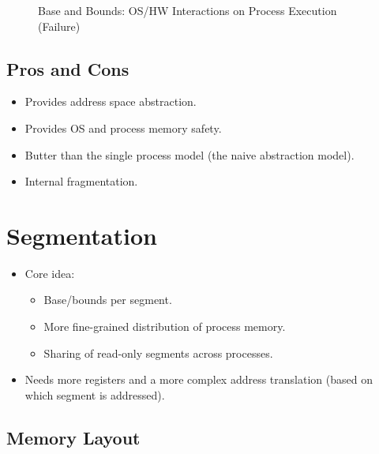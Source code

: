 \documentclass[a4paper, 11pt, accentcolor = tud3b]{tudreport}
\providecommand{\pro}{\item[+]}
\providecommand{\con}{\item[- ]}
\begin{document}
\begin{figure}[H]
	                	\caption{Base and Bounds: OS/HW Interactions on Process Execution (Failure)}
	                \end{figure}

            \subsection{Pros and Cons}
	            \begin{itemize}
	            	\pro Provides address space abstraction.
	            	\pro Provides OS and process memory safety.
	            	\pro Butter than the single process model (the naive abstraction model).
	            	\con Internal fragmentation.
	            \end{itemize}

        \section{Segmentation} %
	        
            \begin{itemize}
            	\item Core idea:
	            	\begin{itemize}
	            		\item Base/bounds per segment.
	            		\item More fine-grained distribution of process memory.
	            		\item Sharing of read-only segments across processes.
	            	\end{itemize}
            	\item Needs more registers and a more complex address translation (based on which segment is addressed).
            \end{itemize}

            \subsection{Memory Layout} %
\end{document}
